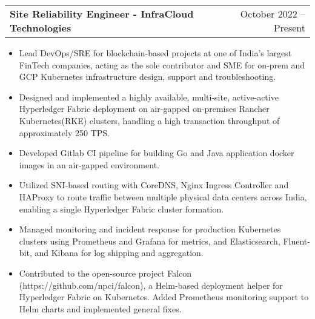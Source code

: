 \documentclass[letterpaper,11pt]{article}
\makeatletter
\newcommand{\resumeItem}[1]{
  \item\small{
    {#1 \vspace{-2pt}}
  }
}
\newcommand{\resumeSubheading}[2]{
  \vspace{-2pt}\item
    \begin{tabular*}{0.97\textwidth}[t]{l@{\extracolsep{\fill}}r}
      \textbf{#1} & #2 \\
    \end{tabular*}\vspace{-7pt}
}
\newcommand{\resumeItemListStart}{\begin{itemize}}
\newcommand{\resumeItemListEnd}{\end{itemize}\vspace{-5pt}}
\makeatother
\begin{document}
    \resumeSubheading
      {Site Reliability Engineer - InfraCloud Technologies}{October 2022 -- Present}
      \resumeItemListStart
        \resumeItem{Lead DevOps/SRE for blockchain-based projects at one of India's largest FinTech companies, acting as the sole contributor and SME for on-prem and GCP Kubernetes infrastructure design, support and troubleshooting.}
        \resumeItem{Designed and implemented a highly available, multi-site, active-active Hyperledger Fabric deployment on air-gapped on-premises Rancher Kubernetes(RKE) clusters, handling a high transaction throughput of approximately 250 TPS.}
        \resumeItem{Developed Gitlab CI pipeline for building Go and Java application docker images in an air-gapped environment.}
        \resumeItem{Utilized SNI-based routing with CoreDNS, Nginx Ingress Controller and HAProxy to route traffic between multiple physical data centers across India, enabling a single Hyperledger Fabric cluster formation.}
        \resumeItem{Managed monitoring and incident response for production Kubernetes clusters using Prometheus and Grafana for metrics, and Elasticsearch, Fluent-bit, and Kibana for log shipping and aggregation.}
        \resumeItem{Contributed to the open-source project Falcon (https://github.com/npci/falcon), a Helm-based deployment helper for Hyperledger Fabric on Kubernetes. Added Prometheus monitoring support to Helm charts and implemented general fixes.}
      \resumeItemListEnd
\end{document}
